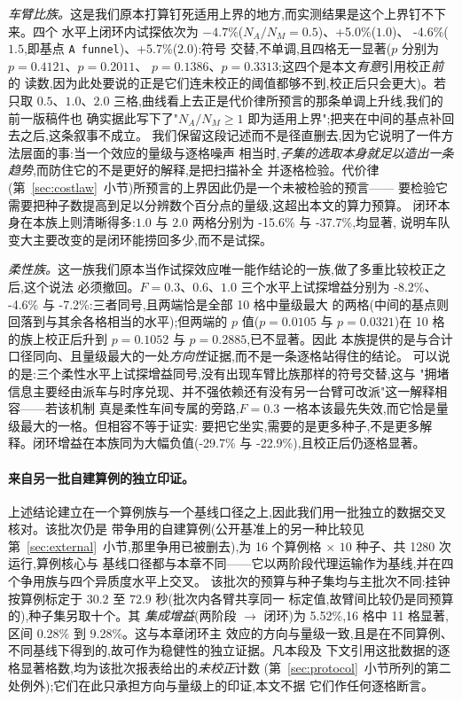 \documentclass[manuscript,screen,review]{acmart}
\newcommand{\NCases}{10}
\newcommand{\GainProbeStarve}{4.7\%}     %
\newcommand{\GainProbeFleetBase}{-4.6\%} %
\newcommand{\GainProbeFleetOne}{+5.0\%}  %
\newcommand{\GainProbeFleetTwo}{+5.7\%}  %
\newcommand{\GainLoopFleetOne}{-15.6\%}  %
\newcommand{\GainLoopFleetTwo}{-37.7\%}  %
\newcommand{\GainLoopFlexLo}{-29.7\%}    %
\newcommand{\GainLoopFlexHi}{-22.9\%}    %
\newcommand{\GainProbeFlexLo}{-8.2\%}    %
\newcommand{\GainProbeFlexHi}{-7.2\%}    %
\newcommand{\PProbeFleetHalfRaw}{=0.4121}
\newcommand{\PProbeFleetOneRaw}{=0.2011}
\newcommand{\PProbeFleetBaseRaw}{=0.1386}
\newcommand{\PProbeFleetTwoRaw}{=0.3313}
\newcommand{\PProbeFlexLoRaw}{=0.0105}
\newcommand{\PProbeFlexLoHolm}{=0.1052}
\newcommand{\PProbeFlexHiRaw}{=0.0321}
\newcommand{\PProbeFlexHiHolm}{=0.2885}
\newcommand{\MatrixCells}{16}
\newcommand{\MatrixRuns}{1280}
\newcommand{\GainIntegMatrix}{5.52\%}    %
\newcommand{\SigIntegMatrix}{11}         %
\newcommand{\GainIntegMatrixLo}{0.28\%}
\newcommand{\GainIntegMatrixHi}{9.28\%}
\begin{document}
\emph{车臂比族。}这是我们原本打算钉死适用上界的地方,而实测结果是这个上界钉不下来。四个
水平上闭环内试探依次为 $-\GainProbeStarve$($N_A/N_M=0.5$)、\GainProbeFleetOne{}($1.0$)、
\GainProbeFleetBase{}($1.5$,即基点 \texttt{A funnel})、\GainProbeFleetTwo{}($2.0$):符号
交替,不单调,且四格无一显著($p$ 分别为 $p\PProbeFleetHalfRaw$、$p\PProbeFleetOneRaw$、
$p\PProbeFleetBaseRaw$、$p\PProbeFleetTwoRaw$;这四个是本文\emph{有意}引用校正\emph{前}的
读数,因为此处要说的正是它们连未校正的阈值都够不到,校正后只会更大)。若只取
$0.5$、$1.0$、$2.0$ 三格,曲线看上去正是代价律所预言的那条单调上升线,我们的前一版稿件也
确实据此写下了"$N_A/N_M\ge 1$ 即为适用上界";把夹在中间的基点补回去之后,这条叙事不成立。
我们保留这段记述而不是径直删去,因为它说明了一件方法层面的事:当一个效应的量级与逐格噪声
相当时,\emph{子集的选取本身就足以造出一条趋势},而防住它的不是更好的解释,是把扫描补全
并逐格检验。代价律(第~\ref{sec:costlaw}~小节)所预言的上界因此仍是一个未被检验的预言——
要检验它需要把种子数提高到足以分辨数个百分点的量级,这超出本文的算力预算。
闭环本身在本族上则清晰得多:$1.0$ 与 $2.0$ 两格分别为 \GainLoopFleetOne{} 与
\GainLoopFleetTwo{},均显著,
说明车队变大主要改变的是闭环能捞回多少,而不是试探。

\emph{柔性族。}这一族我们原本当作试探效应唯一能作结论的一族,做了多重比较校正之后,这个说法
必须撤回。$F=0.3$、$0.6$、$1.0$ 三个水平上试探增益分别为 \GainProbeFlexLo{}、
\GainProbeFleetBase{} 与 \GainProbeFlexHi{}:三者同号,且两端恰是全部 \NCases{} 格中量级最大
的两格(中间的基点则回落到与其余各格相当的水平);但两端的 $p$ 值($p\PProbeFlexLoRaw$ 与
$p\PProbeFlexHiRaw$)在 \NCases{} 格的族上校正后升到 $p\PProbeFlexLoHolm$ 与
$p\PProbeFlexHiHolm$,已不显著。因此
本族提供的是与合计口径同向、且量级最大的一处\emph{方向性}证据,而不是一条逐格站得住的结论。
可以说的是:三个柔性水平上试探增益同号,没有出现车臂比族那样的符号交替,这与
"拥堵信息主要经由派车与时序兑现、并不强依赖还有没有另一台臂可改派"这一解释相容——若该机制
真是柔性车间专属的旁路,$F=0.3$ 一格本该最先失效,而它恰是量级最大的一格。但相容不等于证实:
要把它坐实,需要的是更多种子,不是更多解释。闭环增益在本族同为大幅负值(\GainLoopFlexLo{} 与
\GainLoopFlexHi{}),且校正后仍逐格显著。

\paragraph{来自另一批自建算例的独立印证。}
上述结论建立在一个算例族与一个基线口径之上,因此我们用一批独立的数据交叉核对。该批次仍是
带争用的自建算例(公开基准上的另一种比较见第~\ref{sec:external}~小节,那里争用已被删去),为
\MatrixCells{} 个算例格 $\times$ $10$ 种子、共 \MatrixRuns{} 次运行,算例核心与
基线口径都与本章不同——它以两阶段代理运输作为基线,并在四个争用族与四个异质度水平上交叉。
该批次的预算与种子集均与主批次不同:挂钟按算例标定于 $30.2$ 至 $72.9$ 秒(批次内各臂共享同一
标定值,故臂间比较仍是同预算的),种子集另取十个。其
\emph{集成增益}(两阶段 $\to$ 闭环)为 \GainIntegMatrix{},\MatrixCells{} 格中
\SigIntegMatrix{} 格显著,区间 \GainIntegMatrixLo{} 到 \GainIntegMatrixHi{}。这与本章闭环主
效应的方向与量级一致,且是在不同算例、不同基线下得到的,故可作为稳健性的独立证据。凡本段及
下文引用这批数据的逐格显著格数,均为该批次报表给出的\emph{未校正}计数
(第~\ref{sec:protocol}~小节所列的第二处例外);它们在此只承担方向与量级上的印证,本文不据
它们作任何逐格断言。
\end{document}
